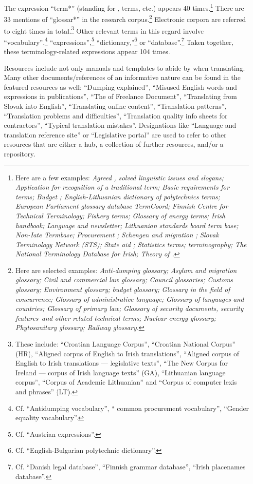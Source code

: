 \documentclass[output=paper]{langsci/langscibook}
\begin{document}
The expression “term*” (standing for , terms, etc.) appears 40 times.\footnote{Here are a few examples: \textit{Agreed , solved linguistic issues and slogans; Application for recognition of a traditional term; Basic requirements for terms; Budget ; English-Lithuanian dictionary of polytechnics terms; European Parliament glossary database TermCoord; Finnish Centre for Technical Terminology; Fishery terms; Glossary of energy terms; Irish  handbook; Language and  newsletter; Lithuanian standards board term base; Non-Iate Termbase; Procurement ; Schengen and migration ; Slovak Terminology Network (STS); State aid ; Statistics terms; terminography; The National Terminology Database for Irish; Theory of .}} There are 33 mentions of “glossar*” in the research corpus.\footnote{Here are selected examples: \textit{Anti-dumping glossary; Asylum and migration glossary; Civil and commercial law glossary; Council glossaries; Customs glossary; Environment glossary;  budget glossary; Glossary in the field of concurrence; Glossary of administrative language; Glossary of languages and countries; Glossary of primary law; Glossary of security documents, security features~and other related technical terms; Nuclear energy glossary; Phytosanitary glossary; Railway glossary.}} Electronic corpora are referred to eight times in total.\footnote{These include: “Croatian Language Corpus”, “Croatian National Corpus” (HR), “Aligned corpus of English to Irish translations”, “Aligned corpus of English to Irish translations — legislative texts”, “The New Corpus for Ireland — corpus of Irish language texts” (GA), “Lithuanian language corpus”, “Corpus of Academic Lithuanian” and “Corpus of computer lexis and phrases” (LT).} Other relevant terms in this regard involve “vocabulary”,\footnote{Cf. “Antidumping vocabulary”, “ common procurement vocabulary”, “Gender equality vocabulary”.} “expressions”,\footnote{Cf. “Austrian expressions”.} “dictionary,”\footnote{Cf. “English-Bulgarian polytechnic dictionary”.} or “database”.\footnote{Cf. “Danish legal database”, “Finnish grammar database”, “Irish placenames database”.} Taken together, these terminology-related expressions appear 104 times.


Resources include not only manuals and templates to abide by when translating. Many other documents/references of an informative nature can be found in the featured resources as well: “Dumping explained”, “Misused English words and expressions in  publications”, “The  of Freelance Document”, “Translating from Slovak into English”, “Translating online content”, “Translation patterns”, “Translation problems and difficulties”, “Translation quality info sheets for contractors”, “Typical translation mistakes”. Designations like “Language and translation reference site” or “Legislative portal” are used to refer to other resources that are either a hub, a collection of further resources, and/or a repository.
\end{document}
